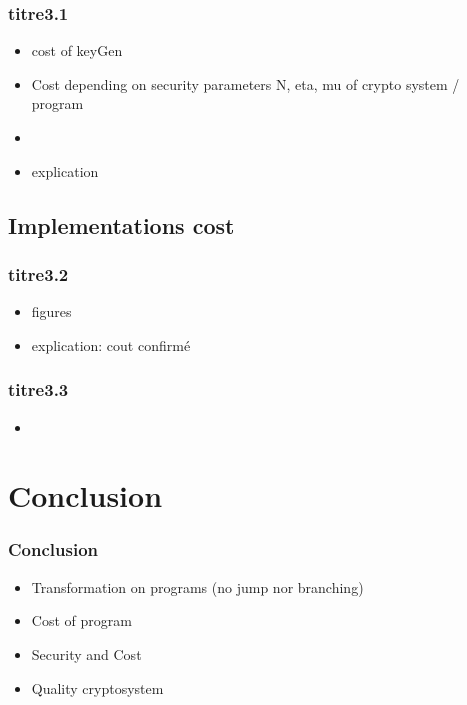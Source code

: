 \documentclass{beamer}
\begin{document}
\begin{frame} \frametitle{titre3.1}
  \begin{itemize}
  \item cost of keyGen
  \item Cost depending on security parameters N, eta, mu of crypto system / program
  \item {}
  \item explication
  \end{itemize}
\end{frame}

\subsection{Implementations cost}

\begin{frame} \frametitle{titre3.2}
  \begin{itemize}
  \item figures
  \item explication: cout confirmé
  \end{itemize}
\end{frame}

\begin{frame} \frametitle{titre3.3}
  \begin{itemize}
  \item {}
  \end{itemize}
\end{frame}

\section[Conclusion]{Conclusion}

\begin{frame}
  \frametitle{Conclusion}
  \begin{itemize}
  \item Transformation on programs (no jump nor branching)

  \item Cost of program

  \item Security and Cost

  \item Quality cryptosystem
  \end{itemize}
\end{frame}
\end{document}

